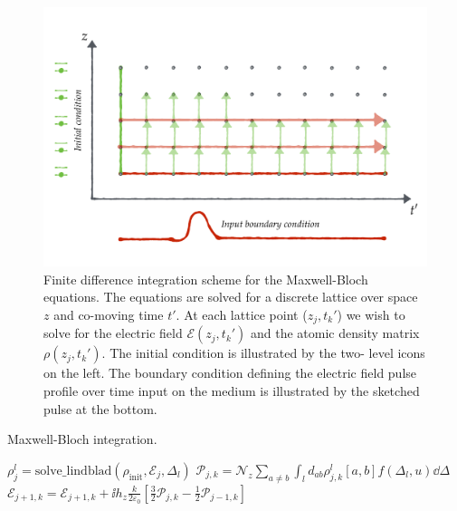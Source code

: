     \begin{figure}
      \includegraphics[width=\linewidth]{figs/10_appendices/mb_scheme.pdf}
      \caption{
      Finite difference integration scheme for the Maxwell-Bloch equations. The
      equations are solved for a discrete lattice over space $z$ and co-moving
      time $t'$. At each lattice point ($z_j,t_k'$) we wish to solve for the
      electric field $\mathcal{E}(z_j,t_k')$ and the atomic density matrix
      $\rho(z_j,t_k')$. The initial condition is illustrated by the two- level
      icons on the left. The boundary condition defining the electric field
      pulse profile over time input on the medium is illustrated by the sketched
      pulse at the bottom.
      }
      \label{fig:mb_scheme}
    \end{figure}

    \begin{algorithm}
    \caption{Maxwell-Bloch integration.}
    \label{alg:mb}
    \begin{algorithmic}[1]
         
             
              \State $\rho^l_{j} = \mathrm{solve\_lindblad}(\rho_\mathrm{init}, 
                \mathcal{E}_j, \Delta_l)$
            \EndFor
             
              \State $\mathcal{P}_{j,k} = 
                \mathcal{N}_z \sum_{a \ne b}\int_{l} d_{ab} 
                \rho^l_{j,k} [a,b] f(\Delta_l, u) \dd \Delta$
              \State $\mathcal{E}_{j+1,k} = 
                \mathcal{E}_{j+1,k} + \ii h_z \frac{k}{2 \varepsilon_0}
                \left[ \frac{3}{2} \mathcal{P}_{j,k} - \frac{1}{2} 
                \mathcal{P}_{j-1,k} \right]$
            \EndFor
        \EndFor
    \end{algorithmic}
    \end{algorithm}

